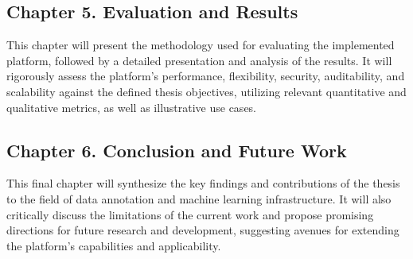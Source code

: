 \subsection*{Chapter 5. Evaluation and Results}
 This chapter will present the methodology used for evaluating the implemented platform, followed by a detailed presentation and analysis of the results. It will rigorously assess the platform's performance, flexibility, security, auditability, and scalability against the defined thesis objectives, utilizing relevant quantitative and qualitative metrics, as well as illustrative use cases.

\subsection*{Chapter 6. Conclusion and Future Work}
 This final chapter will synthesize the key findings and contributions of the thesis to the field of data annotation and machine learning infrastructure. It will also critically discuss the limitations of the current work and propose promising directions for future research and development, suggesting avenues for extending the platform's capabilities and applicability.